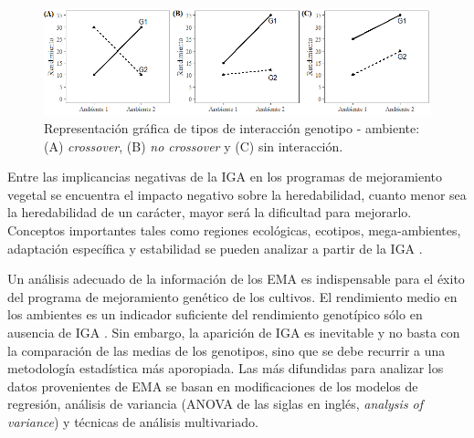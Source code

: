 \begin{figure}[h]
\begin{center}
\includegraphics[width=14cm]{./Graficos/interac}
\end{center}
\caption{  Representación gráfica de tipos de interacción genotipo - ambiente: (A) \emph{crossover}, (B) \emph{no crossover} y (C) sin interacción.}
\label{fig:fig11}
\end{figure}


Entre las implicancias negativas de la IGA en los programas de mejoramiento vegetal se encuentra el impacto negativo sobre la heredabilidad, cuanto menor sea la heredabilidad de un carácter, mayor será la dificultad para mejorarlo. Conceptos importantes tales como regiones ecológicas, ecotipos, mega-ambientes, adaptación específica y estabilidad se pueden analizar a partir de la IGA \citep{YanHunt2001}.

Un análisis adecuado de la información de los EMA es indispensable para el éxito del programa de mejoramiento genético de los cultivos. El rendimiento medio en los ambientes es un indicador suficiente del rendimiento genotípico sólo en ausencia de IGA \citep{YanKang2003}. Sin embargo, la aparición de IGA es inevitable y no basta con la comparación de las medias de los genotipos, sino que se debe recurrir a una metodología estadística más aporopiada. Las más difundidas para analizar los datos provenientes de EMA se basan en modificaciones de los modelos de regresión, análisis de variancia (ANOVA de las siglas en inglés, \emph{analysis of variance}) y técnicas de análisis multivariado. 

